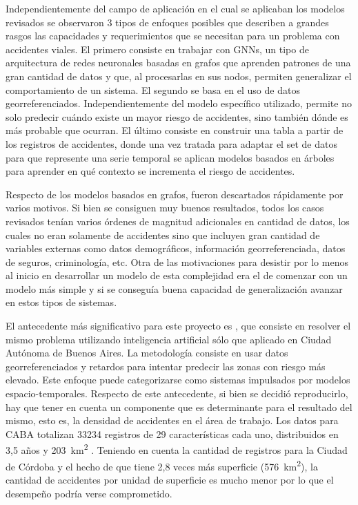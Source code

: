 Independientemente del campo de aplicación en el cual se aplicaban los modelos revisados se observaron 3 tipos de enfoques posibles que describen a grandes rasgos las capacidades y requerimientos que se necesitan para un problema con accidentes viales. El primero consiste en trabajar con GNNs, un tipo de arquitectura de redes neuronales basadas en grafos que aprenden patrones de una gran cantidad de datos y que, al procesarlas en sus nodos, permiten generalizar el comportamiento de un sistema. El segundo se basa en el uso de datos georreferenciados. Independientemente del modelo específico utilizado, permite no solo predecir cuándo existe un mayor riesgo de accidentes, sino también dónde es más probable que ocurran. El último consiste en construir una tabla a partir de los registros de accidentes, donde una vez tratada para adaptar el set de datos para que represente una serie temporal se aplican modelos basados en árboles para aprender en qué contexto se incrementa el riesgo de accidentes.

Respecto de los modelos basados en grafos, fueron descartados rápidamente por varios motivos. Si bien se consiguen muy buenos resultados, todos los casos revisados tenían varios órdenes de magnitud adicionales en cantidad de datos, los cuales no eran solamente de accidentes sino que incluyen gran cantidad de variables externas como datos demográficos, información georreferenciada, datos de seguros, criminología, etc. Otra de las motivaciones para desistir por lo menos al inicio en desarrollar un modelo de esta complejidad era el de comenzar con un modelo más simple y si se conseguía buena capacidad de generalización avanzar en estos tipos de sistemas.

El antecedente más significativo para este proyecto es \textcite{novello2022}, que consiste en resolver el mismo problema utilizando inteligencia artificial sólo que aplicado en Ciudad Autónoma de Buenos Aires. La metodología consiste en usar datos georreferenciados y retardos para intentar predecir las zonas con riesgo más elevado. Este enfoque puede categorizarse como sistemas impulsados por modelos espacio-temporales. Respecto de este antecedente, si bien se decidió reproducirlo, hay que tener en cuenta un componente que es determinante para el resultado del mismo, esto es, la densidad de accidentes en el área de trabajo. Los datos para CABA totalizan \num{33234} registros de 29 características cada uno, distribuidos en 3,5 años y \qty{203}{\kilo\metre\squared} \parencite{novello2022}. Teniendo en cuenta la cantidad de registros para la Ciudad de Córdoba y el hecho de que tiene 2,8 veces más superficie (\qty{576}{\kilo\metre\squared}), la cantidad de accidentes por unidad de superficie es mucho menor por lo que el desempeño podría verse comprometido.

